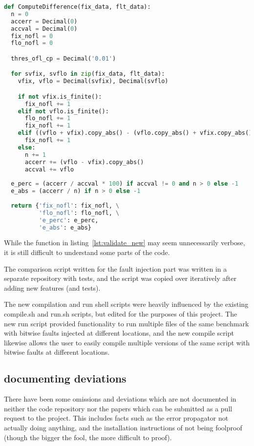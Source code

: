 \begin{lstlisting}[label=lst:validate_original,caption=Validate original,language=python]
def ComputeDifference(fix_data, flt_data):
  n = 0
  accerr = Decimal(0)
  accval = Decimal(0)
  fix_nofl = 0
  flo_nofl = 0

  thres_ofl_cp = Decimal('0.01')

  for svfix, svflo in zip(fix_data, flt_data):
    vfix, vflo = Decimal(svfix), Decimal(svflo)

    if not vfix.is_finite():
      fix_nofl += 1
    elif not vflo.is_finite():
      flo_nofl += 1
      fix_nofl += 1
    elif ((vflo + vfix).copy_abs() - (vflo.copy_abs() + vfix.copy_abs())) > thres_ofl_cp:
      fix_nofl += 1
    else:
      n += 1
      accerr += (vflo - vfix).copy_abs()
      accval += vflo
      
  e_perc = (accerr / accval * 100) if accval != 0 and n > 0 else -1
  e_abs = (accerr / n) if n > 0 else -1
      
  return {'fix_nofl': fix_nofl, \
          'flo_nofl': flo_nofl, \
          'e_perc': e_perc,
          'e_abs': e_abs}
\end{lstlisting}

While the function in listing~\ref{lst:validate_new} may seem unnecessarily verbose, it is still difficult to understand some parts of the code.

The comparison script written for the fault injection part was written in a separate repository with tests, and the script was copied over iteratively after adding new features (and tests).

The new compilation and run shell scripts were heavily influenced by the existing compile.sh and run.sh scripts, but edited for the purposes of this project. The new run script provided functionality to run multiple files of the same benchmark with bitwise faults injected at different locations, and the new compile script likewise allows the user to easily compile multiple versions of the same script with bitwise faults at different locations.


\subsection{documenting deviations}

There have been some omissions and deviations which are not documented in neither the code repository nor the papers which can be submitted as a pull request to the \taffo project. 
This includes facts such as the error propagator not actually doing anything, and the installation instructions of \taffo not being foolproof (though the bigger the fool, the more difficult to proof).

